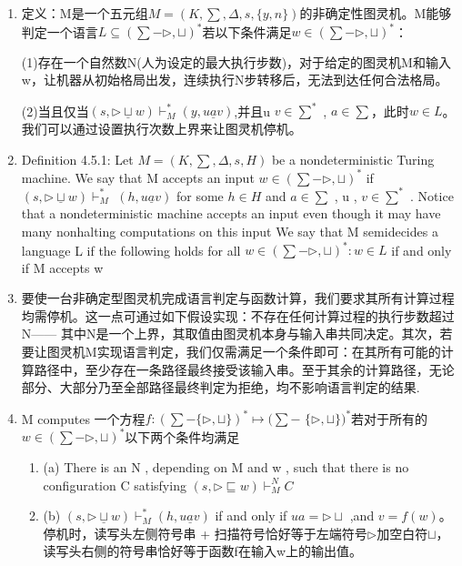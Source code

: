 \documentclass[UTF8]{ctexart}
\begin{document}
\begin{enumerate}
    \item 定义：M是一个五元组\(M=(K, \sum , \Delta, s,\{y, n\})\)的非确定性图灵机。M能够判定一个语言\(L \subseteq(\sum -{\triangleright, \sqcup})^{*}\)若以下条件满足\(w \in(\sum -{\triangleright, \sqcup})^{*}\)：

(1)存在一个自然数N(人为设定的最大执行步数)，对于给定的图灵机M和输入w，让机器从初始格局出发，连续执行N步转移后，无法到达任何合法格局。

(2)当且仅当\((s, \triangleright \underline{\sqcup} w) \vdash_{M}^{*}(y, u \underline{a} v)\),并且u \(v \in \sum ^{*}\) , \(a \in \sum\)，此时\(w \in L\)。我们可以通过设置执行次数上界来让图灵机停机。

    \item Definition 4.5.1: Let \(M=(K, \sum , \Delta, s, H)\) be a nondeterministic Turing machine. We say that M accepts an input \(w \in(\sum -{\triangleright, \sqcup})^{*}\) if \((s, \triangleright \underline{\sqcup} w) \vdash_{M}^{*}\) \((h, u \underline{a} v)\) for some \(h \in H\) and \(a \in \sum\) , u , \(v \in \sum ^{*}\) . Notice that a nondeterministic machine accepts an input even though it may have many nonhalting computations on this input We say that M semidecides a language L if the following holds for all \(w \in(\sum -{\triangleright, \sqcup})^{*}: w \in L\) if and only if M accepts w

    \item 要使一台非确定型图灵机完成语言判定与函数计算，我们要求其所有计算过程均需停机。这一点可通过如下假设实现：不存在任何计算过程的执行步数超过N—— 其中N是一个上界，其取值由图灵机本身与输入串共同决定。其次，若要让图灵机M实现语言判定，我们仅需满足一个条件即可：在其所有可能的计算路径中，至少存在一条路径最终接受该输入串。至于其余的计算路径，无论部分、大部分乃至全部路径最终判定为拒绝，均不影响语言判定的结果.
    
    \item M computes 一个方程\(f:(\sum -\{\triangleright, \sqcup\})^{*} \mapsto(\sum -\) \(\{\triangleright, \sqcup\})^{*}\)若对于所有的\(w \in(\sum -{\triangleright, \sqcup})^{*}\)以下两个条件均满足
    \begin{enumerate}
        \item (a) There is an N , depending on M and w , such that there is no configuration C satisfying \((s, \triangleright \sqsubseteq w) \vdash_{M}^{N} C\)
        \item (b) \((s, \triangleright \underline{\sqcup} w) \vdash_{M}^{*}(h, u \underline{a} v)\) if and only if \(u a=\triangleright \sqcup\) ,and \(v=f(w)\)。停机时，读写头左侧符号串 + 扫描符号恰好等于左端符号\(\triangleright\)加空白符\(\sqcup\)，读写头右侧的符号串恰好等于函数f在输入w上的输出值。
    \end{enumerate}
    

\end{enumerate}
\end{document}
